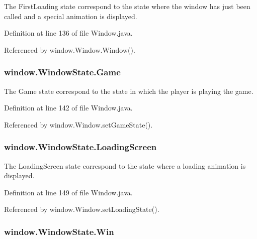 The First\-Loading state correspond to the state where the window has just been called and a special animation is displayed. 



Definition at line 136 of file Window.\-java.



Referenced by window.\-Window.\-Window().

\hypertarget{enumwindow_1_1_window_state_abb4a2512f88d7104f91993174488282d}{
\subsubsection[{Game}]{\setlength{\rightskip}{0pt plus 5cm}window.\-Window\-State.\-Game}}\label{enumwindow_1_1_window_state_abb4a2512f88d7104f91993174488282d}


The Game state correspond to the state in which the player is playing the game. 



Definition at line 142 of file Window.\-java.



Referenced by window.\-Window.\-set\-Game\-State().

\hypertarget{enumwindow_1_1_window_state_a281f52964a4be64ea19bf2a401184521}{
\subsubsection[{Loading\-Screen}]{\setlength{\rightskip}{0pt plus 5cm}window.\-Window\-State.\-Loading\-Screen}}\label{enumwindow_1_1_window_state_a281f52964a4be64ea19bf2a401184521}


The Loading\-Screen state correspond to the state where a loading animation is displayed. 



Definition at line 149 of file Window.\-java.



Referenced by window.\-Window.\-set\-Loading\-State().

\hypertarget{enumwindow_1_1_window_state_adfd70a04c81f1ff3b289d5b766206fb5}{
\subsubsection[{Win}]{\setlength{\rightskip}{0pt plus 5cm}window.\-Window\-State.\-Win}}\label{enumwindow_1_1_window_state_adfd70a04c81f1ff3b289d5b766206fb5}


